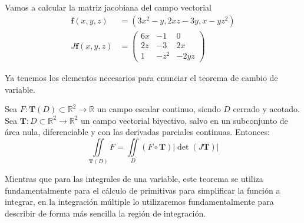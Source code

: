 \begin{ejemplo}
Vamos a calcular la matriz jacobiana del campo vectorial
\begin{align*}
\boldsymbol f(x,y,z) & =
(3x^2-y,2xz-3y,x-yz^2) \\
J\boldsymbol{f}(x,y,z) & =
\begin{pmatrix}
6x & -1 & 0 \\
2z & -3 & 2x \\
1 & -z^2 & -2yz
\end{pmatrix}\tag*{\fej}
\end{align*}
\end{ejemplo}
Ya tenemos los elementos necesarios para enunciar el teorema de cambio de variable.
%
\begin{teorema} Sea $F\colon \boldsymbol{T}(\mathit D)\subset\mathbb{R}^2\to\mathbb{R}$ un campo escalar continuo, siendo $\mathit D$ cerrado y acotado. Sea $\boldsymbol{T}\colon\mathit D\subset\mathbb{R}^2\to\mathbb{R}^2$ un campo vectorial biyectivo, salvo en un subconjunto de área nula, diferenciable y con las derivadas parciales continuas.
Entonces:
\[
\iint\limits_{\boldsymbol{T}(\mathit D)} F = \iint\limits_{\mathit D} (F\circ \boldsymbol{T})|\det(J\boldsymbol{T})|
\]
\end{teorema}
%
Mientras que para las integrales de una variable, este teorema se utiliza
fundamentalmente para el cálculo de primitivas para simplificar la función a integrar, en la integración múltiple lo utilizaremos fundamentalmente para describir de forma más sencilla la región de integración.

